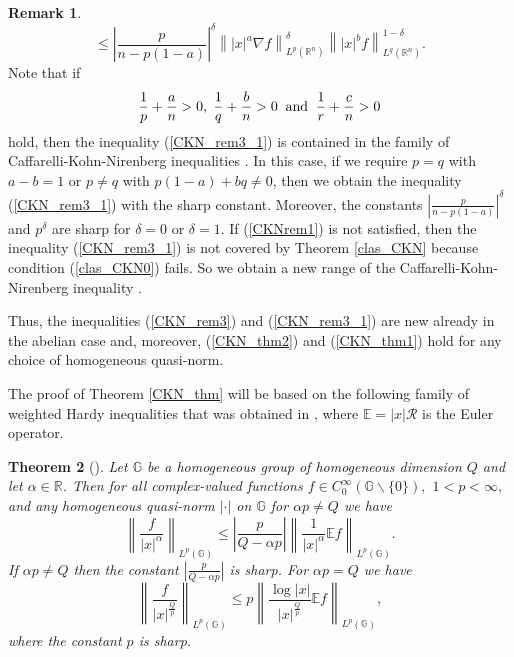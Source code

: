 \documentclass[a4paper,12pt,reqno]{amsart}
\renewcommand\eqref[1]{(\ref{#1})} %
\numberwithin{equation}{section}
\theoremstyle{plain}
\newtheorem{thm}{Theorem}[section]
\theoremstyle{definition}
\newtheorem{rem}[thm]{Remark}
\newcommand{\Rn}{\mathbb R^{n}}
\begin{document}
\begin{rem}
\begin{equation}
\leq \left|\frac{p}{n-p(1-a)}\right|^{\delta} \left\||x|^{a}\nabla f\right\|^{\delta}_{L^{p}(\Rn)}
\left\||x|^{b}f\right\|^{1-\delta}_{L^{q}(\Rn)}.
\end{equation}
Note that if
\begin{equation}\label{CKNrem1}\frac{1}{p}+\frac{a}{n}>0, \;\frac{1}{q}+\frac{b}{n}>0 \;\;{\rm and}\;\; \frac{1}{r}+\frac{c}{n}>0
\end{equation} hold, then the inequality \eqref{CKN_rem3_1} is contained in the family of Caffarelli-Kohn-Nirenberg inequalities \cite{CKN84}. In this case, if we require $p=q$ with $a-b=1$ or $p\neq q$ with $p(1-a)+bq\neq0$, then we obtain the inequality \eqref{CKN_rem3_1} with the sharp constant. Moreover, the constants $\left|\frac{p}{n-p(1-a)}\right|^{\delta}$ and $p^{\delta}$ are sharp for $\delta=0$ or $\delta=1$. If \eqref{CKNrem1} is not satisfied, then the inequality \eqref{CKN_rem3_1} is not covered by Theorem \ref{clas_CKN} because condition \eqref{clas_CKN0} fails. So we obtain a new range of the  Caffarelli-Kohn-Nirenberg inequality \cite{CKN84}.


Thus, the inequalities \eqref{CKN_rem3} and \eqref{CKN_rem3_1} are new already in the abelian case and, moreover, \eqref{CKN_thm2} and \eqref{CKN_thm1} hold for any choice of homogeneous quasi-norm.
\end{rem}

The proof of Theorem \ref{CKN_thm} will be based on the following family of weighted Hardy inequalities that was obtained in \cite[Theorem 3.4]{RSY16}, where $\mathbb{E}=|x|\mathcal{R}$ is the Euler operator.

\begin{thm}[\cite{RSY16}]\label{L_p_weighted_th}
Let $\mathbb{G}$ be a homogeneous group
of homogeneous dimension $Q$ and let $\alpha\in \mathbb{R}$.
Then for all complex-valued functions $f\in C^{\infty}_{0}(\mathbb{G}\backslash\{0\}),$ $1<p<\infty,$ and any homogeneous quasi-norm $|\cdot|$ on $\mathbb{G}$ for $\alpha p \neq Q$ we have
\begin{equation}\label{L_p_weighted}
\left\|\frac{f}{|x|^{\alpha}}\right\|_{L^{p}(\mathbb{G})}\leq
\left|\frac{p}{Q-\alpha p}\right|\left\|\frac{1}{|x|^{\alpha}}\mathbb{E} f\right\|_{L^{p}(\mathbb{G})}.
\end{equation}
If $\alpha p\neq Q$ then the constant $\left|\frac{p}{Q-\alpha p}\right|$ is sharp.
For $\alpha p=Q$ we have
\begin{equation}\label{L_p_weighted_log}
\left\|\frac{f}{|x|^{\frac{Q}{p}}}\right\|_{L^{p}(\mathbb{G})}\leq
p\left\|\frac{\log|x|}{|x|^{\frac{Q}{p}}}\mathbb{E} f\right\|_{L^{p}(\mathbb{G})},
\end{equation}
where the constant $p$ is sharp.
\end{thm}
\end{document}
